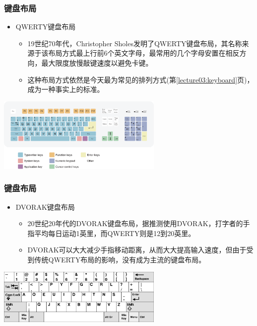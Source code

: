 \documentclass{beamer}
\begin{document}
\begin{frame}
	\frametitle{键盘布局}
	\begin{itemize}
		\item QWERTY键盘布局
		\begin{itemize}
			\item 19世纪70年代，Christopher Sholes发明了QWERTY键盘布局，其名称来源于该布局方式最上行前6个英文字母，最常用的几个字母安置在相反方向，最大限度放慢敲键速度以避免卡键。
			\item 这种布局方式依然是今天最为常见的排列方式{\tiny (第\ref{lecture03:keyboard}页)}，成为一种事实上的标准。
		\end{itemize}
	\end{itemize}
	\begin{center}
	\includegraphics[width=8cm]{images/qwerty.eps}
	\end{center}
\end{frame}

\begin{frame}
	\frametitle{键盘布局}
	\begin{itemize}
		\item DVORAK键盘布局
		\begin{itemize}
			\item 20世纪20年代的DVORAK键盘布局，据推测使用DVORAK，打字者的手指平均每日运动1英里，而QWERTY则是12到20英里。
			\item DVORAK可以大大减少手指移动距离，从而大大提高输入速度，但由于受到传统QWERTY布局的影响，没有成为主流的键盘布局。
		\end{itemize}
	\end{itemize}
	\begin{center}
	\includegraphics[width=8cm]{images/dvorak.png}
	\end{center}
\end{frame}
\end{document}
